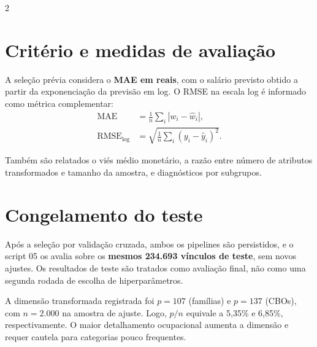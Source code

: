\documentclass[10pt,a4paper]{article}
\begin{document}
\begin{multicols}{2}
\section{Critério e medidas de avaliação}
A seleção prévia considera o \textbf{MAE em reais}, com o salário previsto obtido a partir da exponenciação da previsão em log. O RMSE na escala log é informado como métrica complementar:
\begin{align*}
\mathrm{MAE} &= \frac1n\sum_i |w_i-\hat w_i|,\\
\mathrm{RMSE}_{\log} &= \sqrt{\frac1n\sum_i(y_i-\hat y_i)^2}.
\end{align*}

Também são relatados o viés médio monetário, a razão entre número de atributos transformados e tamanho da amostra, e diagnósticos por subgrupos.

\section{Congelamento do teste}
Após a seleção por validação cruzada, ambos os pipelines são persistidos, e o script 05 os avalia sobre os \textbf{mesmos 234.693 vínculos de teste}, sem novos ajustes. Os resultados de teste são tratados como avaliação final, não como uma segunda rodada de escolha de hiperparâmetros.

A dimensão transformada registrada foi $p=107$ (famílias) e $p=137$ (CBOs), com $n=2.000$ na amostra de ajuste. Logo, $p/n$ equivale a 5,35\% e 6,85\%, respectivamente. O maior detalhamento ocupacional aumenta a dimensão e requer cautela para categorias pouco frequentes.
\end{multicols}
\end{document}
